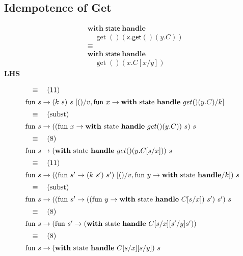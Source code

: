\documentclass[logo,bsc,singlespacing,parskip]{infthesis}
\begin{document}
\subsection*{Idempotence of Get}



\[
\begin{aligned}
    &\mathsf{\textbf{with}} \; \mathsf{state} \; \mathsf{\textbf{handle}} \\
    &\quad \operatorname{get}() \left( \mathsf{x.get}() \left( y.C \right) \right) \\
    &\equiv \\
    &\mathsf{\textbf{with}} \; \mathsf{state} \; \mathsf{\textbf{handle}} \\
    &\quad \operatorname{get}() \left( x.C[x/y] \right)
\end{aligned}
\]
\textbf{LHS}

\[ 
\begin{array}{l}
\quad\equiv\quad (11) \\[5pt]
\text{fun } s \rightarrow (k\ s)\ s\ [()/v, \text{fun } x \rightarrow \text{\textbf{with} state \textbf{handle} } get()(y.C)/k] \\[5pt]
\quad\equiv\quad (\text{subst}) \\[5pt]
\text{fun } s \rightarrow ((\text{fun } x \rightarrow \text{\textbf{with} state \textbf{handle} } get()(y.C))\ s)\ s \\[5pt]
\quad\equiv\quad (8) \\[5pt]
\text{fun } s \rightarrow (\text{\textbf{with} state \textbf{handle} } get()(y.C[s/x]))\ s \\[5pt]
\quad\equiv\quad (11) \\[5pt]
\text{fun } s \rightarrow ((\text{fun } s'\rightarrow (k\ s')\ s')\ [()/v, \text{fun } y\rightarrow \text{\textbf{with} state \textbf{handle}}/k])\ s \\[5pt]
\quad\equiv\quad (\text{subst}) \\[5pt]
\text{fun } s \rightarrow ((\text{fun } s' \rightarrow (( \text{fun } y \rightarrow \text{\textbf{with} state \textbf{handle} } C[s/x])\ s')\ s')\ s \\[5pt]
\quad\equiv\quad (8) \\[5pt]
\text{fun } s \rightarrow (\text{fun } s' \rightarrow (\text{\textbf{with} state \textbf{handle} } C[s/x][s'/y]s')) \\[5pt]
\quad\equiv\quad (8) \\[5pt]
\text{fun } s \rightarrow (\text{\textbf{with} state \textbf{handle} } C[s/x][s/y])\ s
\end{array}
\]
\end{document}

